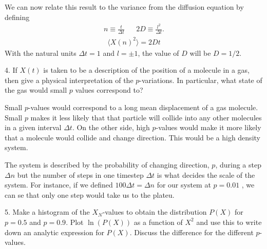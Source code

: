 \documentclass[twocolumn]{article}[10pt]
\begin{document}
We can now relate this result to the variance from the diffusion equation by
defining 
\begin{align*}
n \equiv \frac{t}{\Delta t} && 2D \equiv \frac{l^2}{\Delta t}.
\end{align*}
\begin{align*}
\langle X(n)^2\rangle = 2Dt
\end{align*}
With the natural units $\Delta t = 1$ and $l = \pm1$, 
the value of $D$ will be $D = 1/2$.

{\color{black!70} 
4. If $X(t)$ is taken to be a description of the position of a molecule 
in a gas, then give a physical interpretation of the $p$-variations.
In particular, what state of the gas would small $p$ values 
correspond to?
}

Small $p$-values would correspond to a long mean displacement of a gas
molecule. Small $p$ makes it less likely that that particle will collide
into any other molecules in a given interval $\Delta t$. On the other 
side, high $p$-values would make it more likely that a molecule would
collide and change direction. This would be a high density system. 

The system is described by the probability of changing direction, $p$,
during a step $\Delta n$ but the number of steps in one timestep
$\Delta t$ is what decides the scale of the system. For instance,
if we defined $100\Delta t = \Delta n$ for our system at $p = 0.01$
, we can se that only one step would take us to the plateu. 

{\color{black!70} 
5. Make a histogram of the $X_N$-values to obtain the distribution 
$P(X)$ for $p=0.5$ and $p = 0.9$. Plot $\ln(P(X))$ as a function
of $X^2$ and use this to write down an analytic expression for
$P(X)$. Discuss the difference for the different $p$-values. 
}
\end{document}
